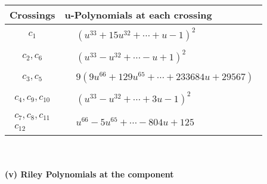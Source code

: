 \documentclass[1p]{elsarticle_modified}
\theoremstyle{definition}
\begin{document}
\begin{tabular}{m{50pt}|m{274pt}}
Crossings & \hspace{64pt}u-Polynomials at each crossing \\
\hline $$\begin{aligned}c_{1}\end{aligned}$$&$\begin{aligned}
&(u^{33}+15 u^{32}+\cdots+u-1)^{2}
\end{aligned}$\\
\hline $$\begin{aligned}c_{2},c_{6}\end{aligned}$$&$\begin{aligned}
&(u^{33}- u^{32}+\cdots- u+1)^{2}
\end{aligned}$\\
\hline $$\begin{aligned}c_{3},c_{5}\end{aligned}$$&$\begin{aligned}
&9(9 u^{66}+129 u^{65}+\cdots+233684 u+29567)
\end{aligned}$\\
\hline $$\begin{aligned}c_{4},c_{9},c_{10}\end{aligned}$$&$\begin{aligned}
&(u^{33}- u^{32}+\cdots+3 u-1)^{2}
\end{aligned}$\\
\hline $$\begin{aligned}c_{7},c_{8},c_{11}\\c_{12}\end{aligned}$$&$\begin{aligned}
&u^{66}-5 u^{65}+\cdots-804 u+125
\end{aligned}$\\
\hline
\end{tabular}\\~\\
\newpage\renewcommand{\arraystretch}{1}
\flushleft \textbf{(v) Riley Polynomials at the component}\newline \\
\end{document}
